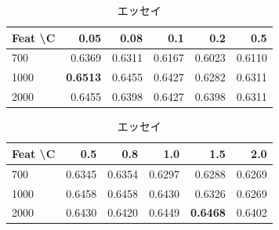 \documentclass[uplatex, dvipdfmx, 11pt, a4paper, report]{jsbook}
\begin{document}
\begin{table}[H]
    \centering
    \small
    \begin{minipage}[t]{0.48\textwidth}
        \centering
        \caption{詩}
        \begin{tabular}{l|rrrrr}
            \hline
            Feat \textbackslash C & 0.05 & 0.08 & 0.1 & 0.2 & 0.5 \\ \hline
            700 & 0.6369 & 0.6311 & 0.6167 & 0.6023 & 0.6110 \\
            1000 & \textbf{0.6513} & 0.6455 & 0.6427 & 0.6282 & 0.6311 \\
            2000 & 0.6455 & 0.6398 & 0.6427 & 0.6398 & 0.6311 \\ \hline
        \end{tabular}
    \end{minipage}
    \hfill
    \begin{minipage}[t]{0.48\textwidth}
        \centering
        \caption{エッセイ}
        \begin{tabular}{l|rrrrr}
            \hline
            Feat \textbackslash C & 0.5 & 0.8 & 1.0 & 1.5 & 2.0 \\ \hline
            700 & 0.6345 & 0.6354 & 0.6297 & 0.6288 & 0.6269 \\
            1000 & 0.6458 & 0.6458 & 0.6430 & 0.6326 & 0.6269 \\
            2000 & 0.6430 & 0.6420 & 0.6449 & \textbf{0.6468} & 0.6402 \\ \hline
        \end{tabular}
    \end{minipage}
\end{table}
\end{document}
